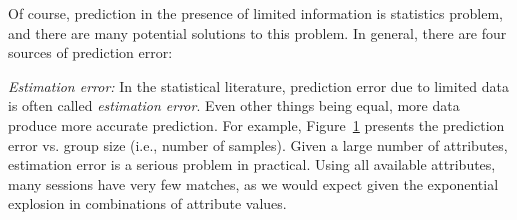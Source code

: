 Of course, prediction in the presence of limited information is statistics problem, and there are many potential solutions to this problem.  In general, there are four sources of prediction error:

\begin{packedenumerate}
  \item \emph{Estimation error:} In the statistical literature, prediction error due to limited data is often called {\it estimation error}.  Even other things being equal, more data produce more accurate prediction. For example, Figure~\ref{fig:group-size-impact} presents the prediction error vs. group size (i.e., number of samples). Given a large number of attributes, estimation error is a serious problem in practical.  Using all available attributes, many sessions have very few matches, as we would expect given the exponential explosion in combinations of attribute values.  

\begin{figure}[h!]
\centering
{}
\label{fig:group-size-impact}
\end{figure}


\end{packedenumerate}
